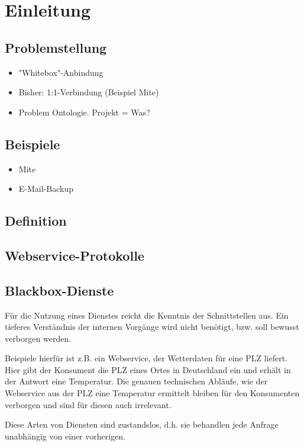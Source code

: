 \documentclass[10pt,a4paper]{article}
\begin{document}
\pagebreak

\tableofcontents

\pagebreak

\section{Einleitung}

\subsection{Problemstellung}
\begin{itemize}
\item "Whitebox"-Anbindung
\item Bisher: 1:1-Verbindung (Beispiel Mite)
\item Problem Ontologie. Projekt = Was?
\end{itemize}
\subsection{Beispiele}
\begin{itemize}
\item Mite
\item E-Mail-Backup
\end{itemize}
\subsection{Definition}
\subsection{Webservice-Protokolle}
\label{l:wsprot}
\subsection{Blackbox-Dienste}
\label{l:blackbox}
Für die Nutzung eines Dienstes reicht die Kenntnis der Schnittstellen aus. Ein tieferes Verständnis
der internen Vorgänge wird nicht benötigt, bzw. soll bewusst verborgen werden. \cite{hhxmlwssoa}

Beispiele hierfür ist z.B. ein Webservice, der Wetterdaten für eine PLZ liefert. Hier gibt der Konsument die PLZ eines Ortes in Deutschland ein und erhält in der Antwort eine Temperatur. Die genauen technischen Abläufe, wie der Webservice aus der PLZ eine Temperatur ermittelt bleiben für den Konsumenten verborgen und sind für diesen auch irrelevant.

Diese Arten von Diensten sind zustandslos, d.h. sie behandlen jede Anfrage unabhängig von einer vorherigen.
\end{document}
